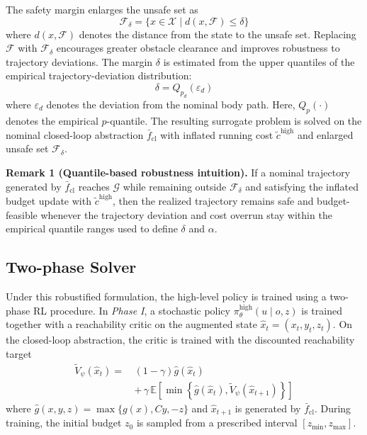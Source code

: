 \documentclass[conference]{IEEEtran}
\begin{document}
The safety margin enlarges the unsafe set as
\begin{equation}
\mathcal{F}_{\delta}=\{x\in\mathcal{X}\mid d(x,\mathcal{F})\le \delta\}
\end{equation}
where $d(x,\mathcal{F})$ denotes the distance from the state to the unsafe set. Replacing $\mathcal{F}$ with $\mathcal{F}_{\delta}$ encourages greater obstacle clearance and improves robustness to trajectory deviations. The margin $\delta$ is estimated from the upper quantiles of the empirical trajectory-deviation distribution:
\begin{equation}
\delta = Q_{p_d}(\varepsilon_d)
\end{equation}
where $\varepsilon_d$ denotes the deviation from the nominal body path. Here, $Q_p(\cdot)$ denotes the empirical $p$-quantile. The resulting surrogate problem is solved on the nominal closed-loop abstraction $\bar{f}_{\mathrm{cl}}$ with inflated running cost $\tilde{c}^{\mathrm{high}}$ and enlarged unsafe set $\mathcal{F}_{\delta}$.

\noindent\textbf{Remark 1 (Quantile-based robustness intuition).}
If a nominal trajectory generated by $\bar{f}_{\mathrm{cl}}$ reaches $\mathcal{G}$ while remaining outside $\mathcal{F}_{\delta}$ and satisfying the inflated budget update with $\tilde{c}^{\mathrm{high}}$, then the realized trajectory remains safe and budget-feasible whenever the trajectory deviation and cost overrun stay within the empirical quantile ranges used to define $\delta$ and $\alpha$. 

\subsection{Two-phase Solver}

Under this robustified formulation, the high-level policy is trained using a two-phase RL procedure. In \emph{Phase I}, a stochastic policy $\pi_\theta^{\mathrm{high}}(u\mid o,z)$ is trained together with a reachability critic on the augmented state $\hat{x}_t=(x_t,y_t,z_t)$. On the closed-loop abstraction, the critic is trained with the discounted reachability target
\begin{equation}
\begin{aligned}
\tilde{V}_{\psi}(\hat{x}_t)
=\,&(1-\gamma)\hat{g}(\hat{x}_t) \\
&+\,\gamma\, \mathbb{E}\!\left[
\min\!\left\{\hat{g}(\hat{x}_t),\tilde{V}_{\psi}(\hat{x}_{t+1})\right\}
\right]
\end{aligned}
\end{equation}
where $\hat{g}(x,y,z)=\max\{g(x),Cy,-z\}$ and $\hat{x}_{t+1}$ is generated by $\bar{f}_{\mathrm{cl}}$. During training, the initial budget $z_0$ is sampled from a prescribed interval $[z_{\min},z_{\max}]$.
\end{document}
